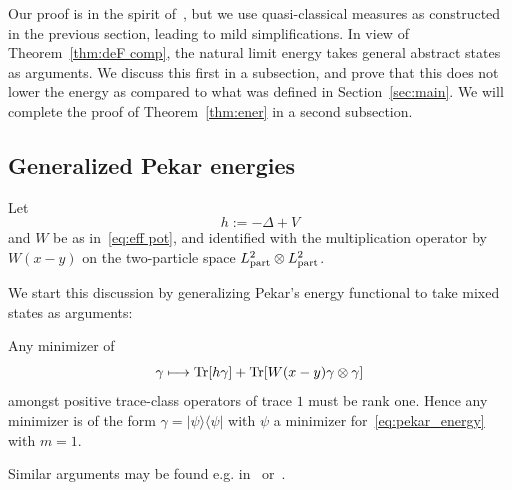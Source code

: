 \documentclass[AHL,Unicode,longabstracts,published]{cedram}
\DeclareMathOperator{\Tr}{Tr}
\newcommand{\1}{\mathds{1}}
\let\oldmapsto\mapsto
\renewcommand*{\mapsto}{\mathchoice{\longmapsto}{\oldmapsto}{\oldmapsto}{\oldmapsto}}
\let\originalleft\left
\let\originalright\right
\renewcommand{\left}{\mathopen{}\mathclose\bgroup\originalleft}
\renewcommand{\right}{\aftergroup\egroup\originalright}
\begin{document}
Our proof is in the spirit of~\cite{CorFalOli-20}, but we use quasi-classical measures as constructed in the previous section, leading to mild simplifications. In view of Theorem~\ref{thm:deF comp}, the natural limit energy takes general abstract states as arguments. We discuss this first in a subsection, and prove that this does not lower the energy as compared to what was defined in Section~\ref{sec:main}. We will complete the proof of Theorem~\ref{thm:ener} in a second subsection.

\subsection{Generalized Pekar energies}

Let
\begin{equation*}
h:=-\Delta + V
\end{equation*}
and $W$ be as in~\eqref{eq:eff pot}, and identified with the multiplication operator by $W(x-y)$ on the two-particle space $L^2_{\rm part} \otimes L^2_{\rm part}$.

We start this discussion by generalizing Pekar's energy functional to take mixed states as arguments:

\begin{lemm}\label{lem:mixed pek}
Any minimizer of
\begin{equation*}
\gamma \mapsto \Tr\left[h \gamma \right] + \Tr \left[W(x-y) \gamma \otimes \gamma \right]
\end{equation*}
amongst positive trace-class operators of trace $1$ must be rank one. Hence any minimizer is of the form $\gamma = |\psi \rangle \langle \psi|$ with $\psi$ a minimizer for~\eqref{eq:pekar_energy} with $m=1$.
\end{lemm}

Similar arguments may be found e.g. in~\cite[Section~5]{Seiringer-02} or~\cite[Section~2]{BauSei-01}.
\end{document}
